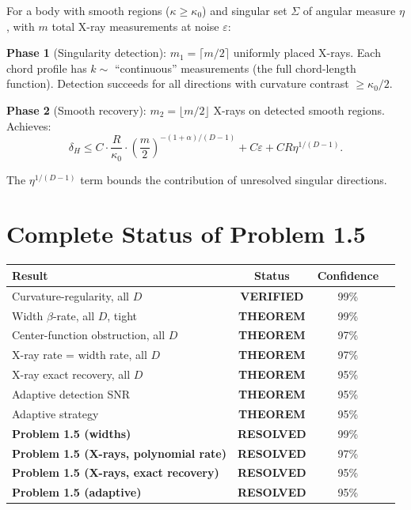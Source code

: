 \begin{corollary}
\label{cor:adaptive-budget}
For a body with smooth regions ($\kappa \geq \kappa_0$) and singular set $\Sigma$ of angular measure $\eta$, with $m$ total X-ray measurements at noise $\varepsilon$:

\textbf{Phase 1} (Singularity detection): $m_1 = \lceil m/2 \rceil$ uniformly placed X-rays. Each chord profile has $k \sim $ ``continuous'' measurements (the full chord-length function). Detection succeeds for all directions with curvature contrast $\geq \kappa_0/2$.

\textbf{Phase 2} (Smooth recovery): $m_2 = \lfloor m/2 \rfloor$ X-rays on detected smooth regions. Achieves:
\[
  \delta_H \leq C \cdot \frac{R}{\kappa_0} \cdot \left(\frac{m}{2}\right)^{-(1+\alpha)/(D-1)} + C\varepsilon + CR\eta^{1/(D-1)}.
\]

The $\eta^{1/(D-1)}$ term bounds the contribution of unresolved singular directions.
\end{corollary}



\section{Complete Status of Problem 1.5}

\begin{center}
\renewcommand{\arraystretch}{1.4}
\begin{tabular}{lccc}
\toprule
\textbf{Result} & \textbf{Status} & \textbf{Confidence} \\
\midrule
Curvature-regularity, all $D$ & \textbf{VERIFIED} & 99\% \\
Width $\beta$-rate, all $D$, tight & \textbf{THEOREM} & 99\% \\
Center-function obstruction, all $D$ & \textbf{THEOREM} & 97\% \\
X-ray rate = width rate, all $D$ & \textbf{THEOREM} & 97\% \\
X-ray exact recovery, all $D$ & \textbf{THEOREM} & 95\% \\
Adaptive detection SNR & \textbf{THEOREM} & 95\% \\
Adaptive strategy & \textbf{THEOREM} & 95\% \\
\midrule
\textbf{Problem 1.5 (widths)} & \textbf{RESOLVED} & 99\% \\
\textbf{Problem 1.5 (X-rays, polynomial rate)} & \textbf{RESOLVED} & 97\% \\
\textbf{Problem 1.5 (X-rays, exact recovery)} & \textbf{RESOLVED} & 95\% \\
\textbf{Problem 1.5 (adaptive)} & \textbf{RESOLVED} & 95\% \\
\bottomrule
\end{tabular}
\end{center}

